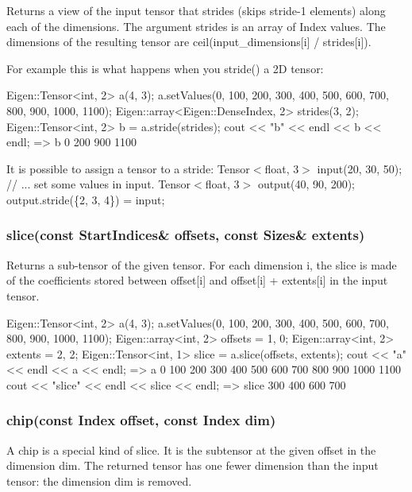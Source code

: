 Returns a view of the input tensor that strides (skips stride-\/1 elements) along each of the dimensions. The argument strides is an array of Index values. The dimensions of the resulting tensor are ceil(input\+\_\+dimensions\mbox{[}i\mbox{]} / strides\mbox{[}i\mbox{]}).

For example this is what happens when you {\ttfamily stride()} a 2D tensor\+: \begin{DoxyVerb}Eigen::Tensor<int, 2> a(4, 3);
a.setValues({{0, 100, 200}, {300, 400, 500}, {600, 700, 800}, {900, 1000, 1100}});
Eigen::array<Eigen::DenseIndex, 2> strides({3, 2});
Eigen::Tensor<int, 2> b = a.stride(strides);
cout << "b" << endl << b << endl;
=>
b
   0   200
 900  1100
\end{DoxyVerb}


It is possible to assign a tensor to a stride\+: Tensor$<$float, 3$>$ input(20, 30, 50); // ... set some values in input. Tensor$<$float, 3$>$ output(40, 90, 200); output.\+stride(\{2, 3, 4\}) = input;

\subsubsection*{slice(const Start\+Indices\& offsets, const Sizes\& extents)}

Returns a sub-\/tensor of the given tensor. For each dimension i, the slice is made of the coefficients stored between offset\mbox{[}i\mbox{]} and offset\mbox{[}i\mbox{]} + extents\mbox{[}i\mbox{]} in the input tensor. \begin{DoxyVerb}Eigen::Tensor<int, 2> a(4, 3);
a.setValues({{0, 100, 200}, {300, 400, 500},
             {600, 700, 800}, {900, 1000, 1100}});
Eigen::array<int, 2> offsets = {1, 0};
Eigen::array<int, 2> extents = {2, 2};
Eigen::Tensor<int, 1> slice = a.slice(offsets, extents);
cout << "a" << endl << a << endl;
=>
a
   0   100   200
 300   400   500
 600   700   800
 900  1000  1100
cout << "slice" << endl << slice << endl;
=>
slice
 300   400
 600   700
\end{DoxyVerb}


\subsubsection*{chip(const Index offset, const Index dim)}

A chip is a special kind of slice. It is the subtensor at the given offset in the dimension dim. The returned tensor has one fewer dimension than the input tensor\+: the dimension dim is removed.

